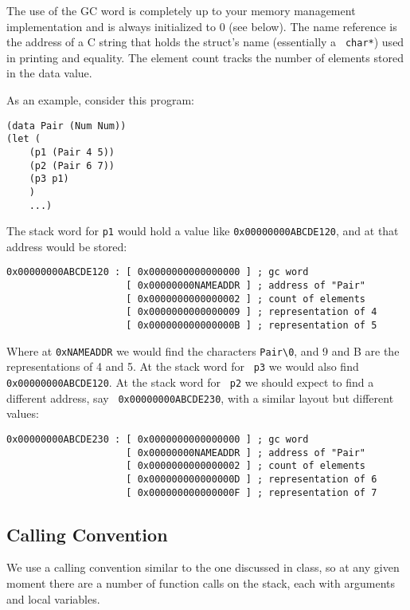 \documentclass[10pt, oneside]{article}
\begin{document}
The use of the GC word is completely up to your memory management
implementation and is always initialized to 0 (see below). The name reference
is the address of a C string that holds the struct's name (essentially a {\tt
char*}) used in printing and equality. The element count tracks the number of
elements stored in the data value.

As an example, consider this program:

\begin{lstlisting}
(data Pair (Num Num))
(let (
    (p1 (Pair 4 5))
    (p2 (Pair 6 7))
    (p3 p1)
    )
    ...)
\end{lstlisting}

The stack word for {\tt p1} would hold a value like {\tt 0x00000000ABCDE120}, and
at that address would be stored:

\begin{verbatim}
0x00000000ABCDE120 : [ 0x0000000000000000 ] ; gc word
                     [ 0x00000000NAMEADDR ] ; address of "Pair"
                     [ 0x0000000000000002 ] ; count of elements
                     [ 0x0000000000000009 ] ; representation of 4
                     [ 0x000000000000000B ] ; representation of 5
\end{verbatim}

Where at {\tt 0xNAMEADDR} we would find the characters {\tt Pair\verb+\+0},
and 9 and B are the representations of 4 and 5. At the stack word for {\tt
p3} we would also find {\tt 0x00000000ABCDE120}. At the stack word for {\tt
p2} we should expect to find a different address, say {\tt
0x00000000ABCDE230}, with a similar layout but different values:

\begin{verbatim}
0x00000000ABCDE230 : [ 0x0000000000000000 ] ; gc word
                     [ 0x00000000NAMEADDR ] ; address of "Pair"
                     [ 0x0000000000000002 ] ; count of elements
                     [ 0x000000000000000D ] ; representation of 6
                     [ 0x000000000000000F ] ; representation of 7
\end{verbatim}

\subsection*{Calling Convention}

We use a calling convention similar to the one discussed in class, so at any
given moment there are a number of function calls on the stack, each with
arguments and local variables.
\end{document}

